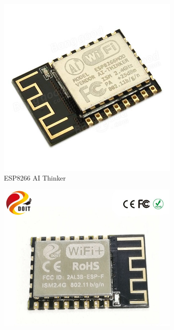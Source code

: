\documentclass{beamer}
\begin{document}
\begin{frame}
\begin{minipage}{\textwidth}
	
	\begin{figure}
		\centering
		\vspace{-10pt}
		\begin{subfigure}[b]{0.25\textwidth}
			\includegraphics[width=\textwidth]{ESP8266AIThinker.jpg}
			\caption{ESP8266 AI Thinker}
			\label{fig:arudinddffgdo_uno}
		\end{subfigure}
		\begin{subfigure}[b]{0.25\textwidth}
			\includegraphics[width=\textwidth]{DOIT-ESP8266-ESP-F.jpg}

\end{subfigure}
\end{figure}
\end{minipage}
\end{frame}
\end{document}

